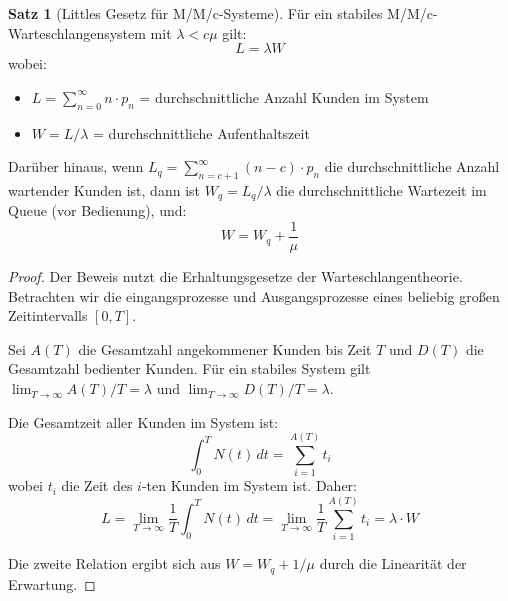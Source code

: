 \documentclass[a4paper,11pt]{article}
\theoremstyle{definition}
\newtheorem{satz}{Satz}
\newenvironment{beweis}{\begin{proof}}{\end{proof}}
\begin{document}
\begin{satz}[Littles Gesetz für M/M/c-Systeme]
    \label{satz:littles_detailed}
    Für ein stabiles M/M/c-Warteschlangensystem mit $\lambda < c\mu$ gilt:
    \[
        L = \lambda W
    \]
    wobei:
    \begin{itemize}
        \item $L = \sum_{n=0}^{\infty} n \cdot p_n$ = durchschnittliche Anzahl Kunden im System
        \item $W = L/\lambda$ = durchschnittliche Aufenthaltszeit
    \end{itemize}

    Darüber hinaus, wenn $L_q = \sum_{n=c+1}^{\infty} (n-c) \cdot p_n$ die durchschnittliche 
    Anzahl wartender Kunden ist, dann ist $W_q = L_q/\lambda$ die durchschnittliche Wartezeit 
    im Queue (vor Bedienung), und:
    \[
        W = W_q + \frac{1}{\mu}
    \]

    \begin{beweis}
        Der Beweis nutzt die Erhaltungsgesetze der Warteschlangentheorie. Betrachten wir 
        die eingangsprozesse und Ausgangsprozesse eines beliebig großen Zeitintervalls $[0, T]$.

        Sei $A(T)$ die Gesamtzahl angekommener Kunden bis Zeit $T$ und $D(T)$ die Gesamtzahl 
        bedienter Kunden. Für ein stabiles System gilt $\lim_{T \to \infty} A(T)/T = \lambda$ 
        und $\lim_{T \to \infty} D(T)/T = \lambda$.

        Die Gesamtzeit aller Kunden im System ist:
        \[
            \int_0^T N(t) \, dt = \sum_{i=1}^{A(T)} t_i
        \]
        wobei $t_i$ die Zeit des $i$-ten Kunden im System ist. Daher:
        \[
            L = \lim_{T \to \infty} \frac{1}{T} \int_0^T N(t) \, dt = \lim_{T \to \infty} 
                \frac{1}{T} \sum_{i=1}^{A(T)} t_i = \lambda \cdot W
        \]

        Die zweite Relation ergibt sich aus $W = W_q + 1/\mu$ durch die Linearität der Erwartung.
    \end{beweis}
\end{satz}
\end{document}
